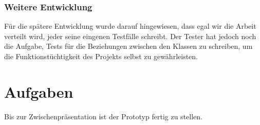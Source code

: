 \documentclass{scrartcl}
\begin{document}
\subsubsection{Weitere Entwicklung}
Für die spätere Entwicklung wurde darauf hingewiesen, dass egal wir die Arbeit verteilt wird, jeder seine eingenen Testfälle schreibt. Der Tester hat jedoch noch die Aufgabe, Tests für die Beziehungen zwischen den Klassen zu schreiben, um  die Funktionstüchtigkeit des Projekts selbst zu gewährleisten.
\vspace*{1em}

\section{Aufgaben}
Bis zur Zwischenpr\"asentation ist der Prototyp fertig zu stellen.
\end{document}
